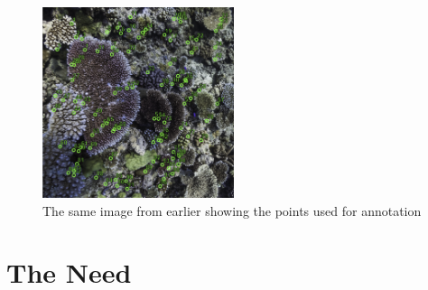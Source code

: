 \documentclass{beamer}
\newcommand{\cmark}{\ding{51}}
\newcommand{\xmark}{\ding{55}}
\begin{document}
              \begin{frame}
                  \begin{figure}
                      \centering
                      \includegraphics[width = 0.5\textwidth]{coral_points.jpg}
                      \caption{The same image from earlier showing the points used for annotation}
                  \end{figure}
              \end{frame}


    \section{The Need}
\end{document}
